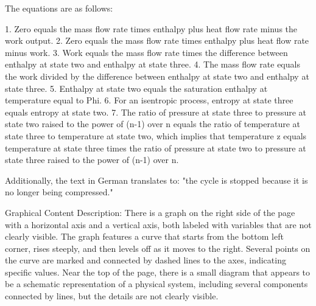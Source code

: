 The equations are as follows:

1. Zero equals the mass flow rate times enthalpy plus heat flow rate minus the work output.
2. Zero equals the mass flow rate times enthalpy plus heat flow rate minus work.
3. Work equals the mass flow rate times the difference between enthalpy at state two and enthalpy at state three.
4. The mass flow rate equals the work divided by the difference between enthalpy at state two and enthalpy at state three.
5. Enthalpy at state two equals the saturation enthalpy at temperature equal to Phi.
6. For an isentropic process, entropy at state three equals entropy at state two.
7. The ratio of pressure at state three to pressure at state two raised to the power of (n-1) over n equals the ratio of temperature at state three to temperature at state two, which implies that temperature z equals temperature at state three times the ratio of pressure at state two to pressure at state three raised to the power of (n-1) over n.

Additionally, the text in German translates to: "the cycle is stopped because it is no longer being compressed."

Graphical Content Description:
There is a graph on the right side of the page with a horizontal axis and a vertical axis, both labeled with variables that are not clearly visible. The graph features a curve that starts from the bottom left corner, rises steeply, and then levels off as it moves to the right. Several points on the curve are marked and connected by dashed lines to the axes, indicating specific values. Near the top of the page, there is a small diagram that appears to be a schematic representation of a physical system, including several components connected by lines, but the details are not clearly visible.